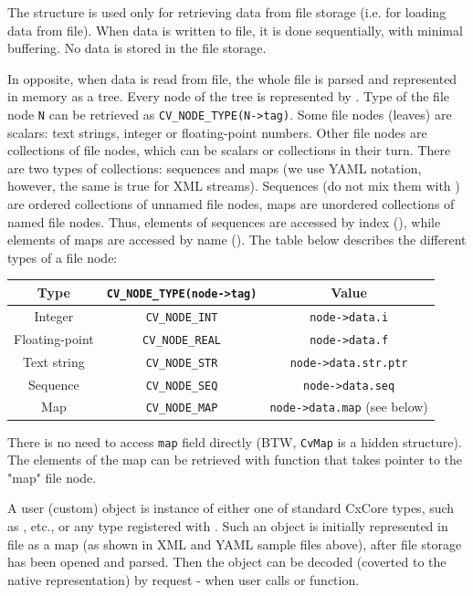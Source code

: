 The structure is used only for retrieving data from file storage
(i.e. for loading data from file). When data is written to file,
it is done sequentially, with minimal buffering. No data is stored
in the file storage.

In opposite, when data is read from file, the whole file is parsed
and represented in memory as a tree. Every node of the tree is
represented by . Type of the file node \texttt{N}
can be retrieved as \texttt{CV\_NODE\_TYPE(N->tag)}. Some file nodes
(leaves) are scalars: text strings, integer or floating-point
numbers. Other file nodes are collections of file nodes, which can
be scalars or collections in their turn. There are two types of
collections: sequences and maps (we use YAML notation, however, the
same is true for XML streams). Sequences (do not mix them with
) are ordered collections of unnamed file nodes, maps
are unordered collections of named file nodes. Thus, elements of
sequences are accessed by index (), while elements
of maps are accessed by name (). The table
below describes the different types of a file node:

\begin{tabular}{| c | c | c |}
\hline
Type           & \texttt{CV\_NODE\_TYPE(node->tag)} & Value\\ \hline \hline
Integer        & \texttt{CV\_NODE\_INT}             & \texttt{node->data.i} \\ \hline
Floating-point & \texttt{CV\_NODE\_REAL}            & \texttt{node->data.f} \\ \hline
Text string    & \texttt{CV\_NODE\_STR}             & \texttt{node->data.str.ptr} \\ \hline
Sequence       & \texttt{CV\_NODE\_SEQ}             & \texttt{node->data.seq} \\ \hline
Map            & \texttt{CV\_NODE\_MAP}             & \texttt{node->data.map} (see below)\\ \hline
\end{tabular}

There is no need to access \texttt{map} field directly (BTW,
\texttt{CvMap} is a hidden structure). The elements of the map can
be retrieved with  function that takes
pointer to the "map" file node.

A user (custom) object is instance of either one of standard CxCore
types, such as ,  etc., or any type
registered with . Such an object is initially
represented in file as a map (as shown in XML and YAML sample files
above), after file storage has been opened and parsed. Then the
object can be decoded (coverted to the native representation) by
request - when user calls  or  function.


